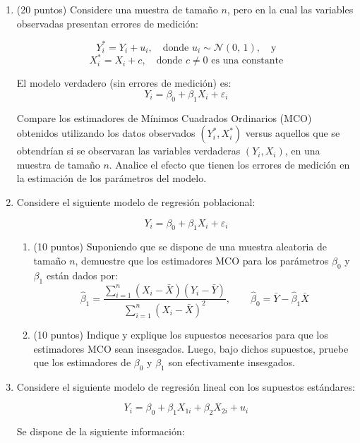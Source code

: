 \documentclass[10pt,a4paper]{article}
\begin{document}
\begin{enumerate}
\item (20 puntos) Considere una muestra de tamaño \( n \), pero en la cual las variables observadas presentan errores de medición:

\[
Y_i^* = Y_i + u_i, \quad \text{donde } u_i \sim \mathcal{N}(0,\,1), \quad \text{y}
\]
\[
X_i^* = X_i + c, \quad \text{donde } c \neq 0 \text{ es una constante}
\]

El modelo verdadero (sin errores de medición) es:
\[
Y_i = \beta_0 + \beta_1 X_i + \varepsilon_i
\]

Compare los estimadores de Mínimos Cuadrados Ordinarios (MCO) obtenidos utilizando los datos observados \((Y_i^*, X_i^*)\) versus aquellos que se obtendrían si se observaran las variables verdaderas \((Y_i, X_i)\), en una muestra de tamaño \( n \). Analice el efecto que tienen los errores de medición en la estimación de los parámetros del modelo.




\item Considere el siguiente modelo de regresión poblacional:

\[
Y_i = \beta_0 + \beta_1 X_i + \varepsilon_i
\]

\begin{enumerate}
    \item[(a)] (10 puntos) Suponiendo que se dispone de una muestra aleatoria de tamaño \( n \), demuestre que los estimadores  MCO para los parámetros \( \beta_0 \) y \( \beta_1 \) están dados por:
    \[
    \hat{\beta}_1 = \frac{\sum_{i=1}^{n}(X_i - \bar{X})(Y_i - \bar{Y})}{\sum_{i=1}^{n}(X_i - \bar{X})^2}, \qquad
    \hat{\beta}_0 = \bar{Y} - \hat{\beta}_1 \bar{X}
    \]

    \item[(b)] (10 puntos) Indique y explique los supuestos necesarios para que los estimadores MCO sean insesgados. Luego, bajo dichos supuestos, pruebe que los estimadores de \( \beta_0 \) y \( \beta_1 \) son efectivamente insesgados.
\end{enumerate}

\vspace{0.5cm}




    \item Considere el siguiente modelo de regresión lineal con los supuestos estándares:

    \[
    Y_i = \beta_0 + \beta_1 X_{1i} + \beta_2 X_{2i} + u_i
    \]
    
    Se dispone de la siguiente información:
    

\end{enumerate}
\end{document}
